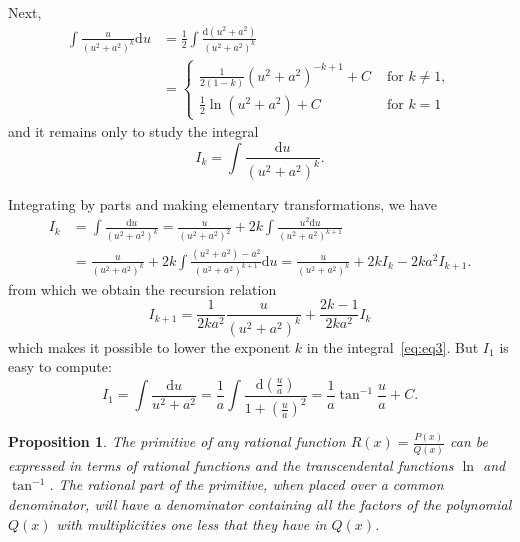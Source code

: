 \documentclass[a4paper,12pt]{article} %
\newtheorem{proposition}{Proposition}[section]
\begin{document}
Next, 
\[
    \begin{split}
        \int \frac{u}{(u^2 + a^2)^k}\mathrm{d}u & = \frac{1}{2}\int 
        \frac{\mathrm{d}(u^2 + a^2)}{(u^2 + a^2)^k}\\  & = 
        \left\{\begin{array}{cl} \frac{1}{2(1-k)}\left(u^2 + a^2\right)^{-k+1} + C & \text{ for } k \ne 1, \\
            \frac{1}{2}\ln (u^2 + a^2) + C & \text{ for } k = 1 \end{array}\right.
    \end{split}
    \]
and it remains only to study the integral 
\begin{equation}
    I_k = \int \frac{\mathrm{d}u}{(u^2 + a^2)^k}.
    \label{eq:eq3}
\end{equation}

Integrating by parts and making elementary transformations, we have 
\[
    \begin{split}
        I_k  & = \int \frac{\mathrm{d}u}{(u^2 + a^2)^k} = \frac{u}{(u^2 + a^2)^2}
        + 2k \int \frac{u^2\mathrm{d}u}{(u^2 + a^2)^{k+1}} \\ & = 
        \frac{u}{(u^2 + a^2)^k} + 2k \int \frac{(u^2 + a^2) - a^2}{(u^2 + a^2)^{k+1}}
        \mathrm{d}u = \frac{u}{(u^2 + a^2)^k} + 2kI_k - 2ka^2I_{k+1}.
    \end{split}
        \]
from which we obtain the recursion relation
\begin{equation}
    I_{k+1} = \frac{1}{2ka^2}\frac{u}{(u^2 + a^2)^k} + \frac{2k - 1}{2ka^2}I_k
\end{equation}
which makes it possible to lower the exponent $k$ in the integral~\ref{eq:eq3}.
But $I_1$ is easy to compute:
\begin{equation}
    I_1 = \int \frac{\mathrm{d}u}{u^2 + a^2} = \frac{1}{a}\int \frac{\mathrm{d}\left(\frac{u}{a}\right)}
    {1+\left(\frac{u}{a}\right)^2} = \frac{1}{a}\tan^{-1}\frac{u}{a} + C.
\end{equation}

\begin{proposition}
    \normalfont
    The primitive of any rational function $R(x) = \frac{P(x)}{Q(x)}$ can be 
    expressed in terms of rational functions and the transcendental functions 
    $\ln$ and $\tan^{-1}$. The rational part of the primitive, when placed over a 
    common denominator, will have a denominator containing all the factors 
    of the polynomial $Q(x)$ with multiplicities one less that they have in $Q(x)$.
\end{proposition}
\end{document}
